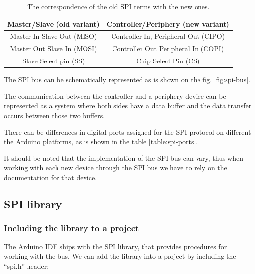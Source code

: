 \documentclass[../sparc.tex]{subfiles}
\begin{document}
\begin{table}[H]
  \centering
  \begin{tabular}{ | c | c | }
    \hline
    \textbf{Master/Slave (old variant)}
    & \textbf{Controller/Periphery (new variant)} \\
    \hline
    Master In Slave Out (MISO) & Controller In, Peripheral Out (CIPO) \\
    \hline
    Master Out Slave In (MOSI) & Controller Out Peripheral In (COPI) \\
    \hline
    Slave Select pin (SS) & Chip Select Pin (CS) \\
    \hline
  \end{tabular}
  \caption{The correspondence of the old SPI terms with the new ones.}
  \label{table:spi-old-terminology}
\end{table}

The SPI bus can be schematically represented as is shown on the
fig. \ref{fig:spi-bus}.


The communication between the controller and a periphery device can be
represented as a system where both sides have a data buffer and the data
transfer occurs between those two buffers.

There can be differences in digital ports assigned for the
SPI\cite{arduino:reference} protocol on different the Arduino platforms, as is
shown in the table \ref{table:spi-ports}.


It should be noted that the implementation of the SPI bus can vary, thus when
working with each new device through the SPI bus we have to rely on the
documentation for that device.

\subsection{SPI library}

\subsubsection{Including the library to a project}

The Arduino IDE ships with the SPI library\cite{arduino:reference}, that
provides procedures for working with the bus.  We can add the library into a
project by including the ``spi.h'' header:
\end{document}
